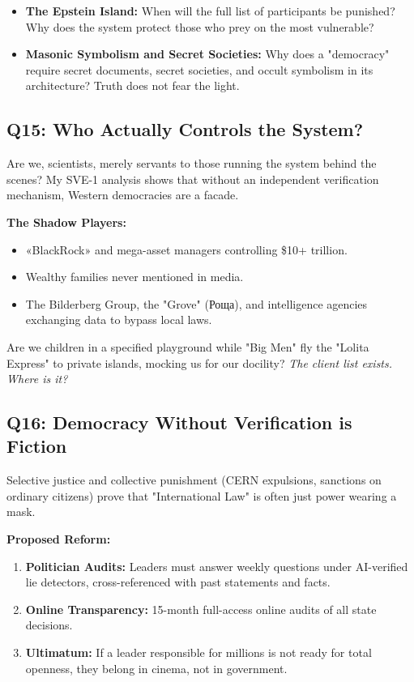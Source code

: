 \documentclass[11pt,a4paper]{article}
\theoremstyle{definition}
\theoremstyle{remark}
\begin{document}
\begin{itemize}
    \item \textbf{The Epstein Island:} When will the full list of participants be punished? Why does the system protect those who prey on the most vulnerable?
    \item \textbf{Masonic Symbolism and Secret Societies:} Why does a "democracy" require secret documents, secret societies, and occult symbolism in its architecture? Truth does not fear the light.
\end{itemize}

\subsection{Q15: Who Actually Controls the System?}

Are we, scientists, merely servants to those running the system behind the scenes? My SVE-1 analysis shows that without an independent verification mechanism, Western democracies are a facade.

\textbf{The Shadow Players:}
\begin{itemize}
\item «BlackRock» and mega-asset managers controlling \$10+ trillion.
\item Wealthy families never mentioned in media.
\item The Bilderberg Group, the "Grove" (Роща), and intelligence agencies exchanging data to bypass local laws.
\end{itemize}

Are we children in a specified playground while "Big Men" fly the "Lolita Express" to private islands, mocking us for our docility? \textit{The client list exists. Where is it?}

\subsection{Q16: Democracy Without Verification is Fiction}

Selective justice and collective punishment (CERN expulsions, sanctions on ordinary citizens) prove that "International Law" is often just power wearing a mask. 

\textbf{Proposed Reform:}
\begin{enumerate}
    \item \textbf{Politician Audits:} Leaders must answer weekly questions under AI-verified lie detectors, cross-referenced with past statements and facts.
    \item \textbf{Online Transparency:} 15-month full-access online audits of all state decisions.
    \item \textbf{Ultimatum:} If a leader responsible for millions is not ready for total openness, they belong in cinema, not in government.
\end{enumerate}
\end{document}
